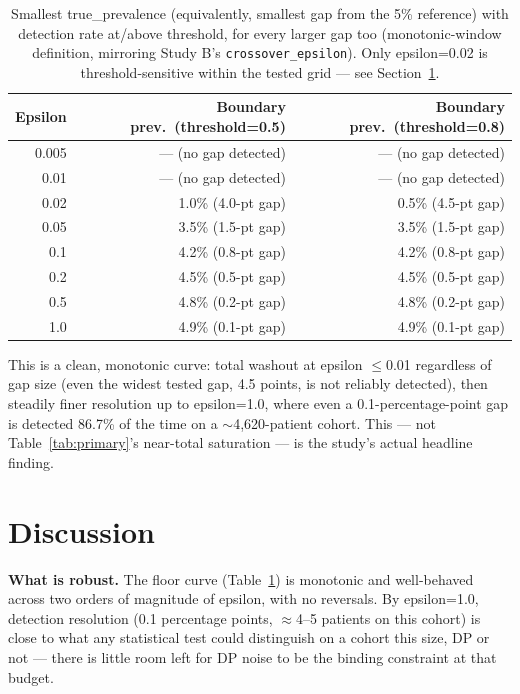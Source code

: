 \documentclass[11pt]{article}
\begin{document}
\begin{table}[H]
\centering
\begin{tabular}{rrr}
\toprule
Epsilon & Boundary prev.\ (threshold=0.5) & Boundary prev.\ (threshold=0.8) \\
\midrule
0.005 & --- (no gap detected)   & --- (no gap detected) \\
0.01  & --- (no gap detected)   & --- (no gap detected) \\
0.02  & 1.0\% (4.0-pt gap)      & 0.5\% (4.5-pt gap) \\
0.05  & 3.5\% (1.5-pt gap)      & 3.5\% (1.5-pt gap) \\
0.1   & 4.2\% (0.8-pt gap)      & 4.2\% (0.8-pt gap) \\
0.2   & 4.5\% (0.5-pt gap)      & 4.5\% (0.5-pt gap) \\
0.5   & 4.8\% (0.2-pt gap)      & 4.8\% (0.2-pt gap) \\
1.0   & 4.9\% (0.1-pt gap)      & 4.9\% (0.1-pt gap) \\
\bottomrule
\end{tabular}
\caption{Smallest true\_prevalence (equivalently, smallest gap from the 5\% reference) with detection rate at/above threshold, for every larger gap too (monotonic-window definition, mirroring Study B's \texttt{crossover\_epsilon}). Only epsilon=0.02 is threshold-sensitive within the tested grid --- see Section~\ref{sec:discussion}.}
\label{tab:floor-boundary}
\end{table}

This is a clean, monotonic curve: total washout at epsilon $\leq$0.01 regardless of gap size (even the widest tested gap, 4.5 points, is not reliably detected), then steadily finer resolution up to epsilon=1.0, where even a 0.1-percentage-point gap is detected 86.7\% of the time on a $\sim$4,620-patient cohort. This --- not Table~\ref{tab:primary}'s near-total saturation --- is the study's actual headline finding.

\section{Discussion}
\label{sec:discussion}

\textbf{What is robust.} The floor curve (Table~\ref{tab:floor-boundary}) is monotonic and well-behaved across two orders of magnitude of epsilon, with no reversals. By epsilon=1.0, detection resolution (0.1 percentage points, $\approx$4--5 patients on this cohort) is close to what any statistical test could distinguish on a cohort this size, DP or not --- there is little room left for DP noise to be the binding constraint at that budget.
\end{document}
